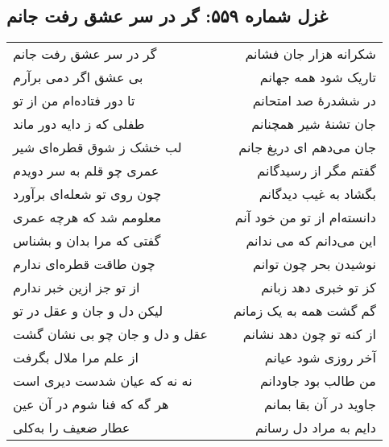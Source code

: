 \begin{center}
\section*{غزل شماره ۵۵۹: گر در سر عشق رفت جانم}
\label{sec:559}
\begin{longtable}{l p{0.5cm} r}
گر در سر عشق رفت جانم
&&
شکرانه هزار جان فشانم
\\
بی عشق اگر دمی برآرم
&&
تاریک شود همه جهانم
\\
تا دور فتاده‌ام من از تو
&&
در ششدرهٔ صد امتحانم
\\
طفلی که ز دایه دور ماند
&&
جان تشنهٔ شیر همچنانم
\\
لب خشک ز شوق قطره‌ای شیر
&&
جان می‌دهم ای دریغ جانم
\\
عمری چو قلم به سر دویدم
&&
گفتم مگر از رسیدگانم
\\
چون روی تو شعله‌ای برآورد
&&
بگشاد به غیب دیدگانم
\\
معلومم شد که هرچه عمری
&&
دانسته‌ام از تو من خود آنم
\\
گفتی که مرا بدان و بشناس
&&
این می‌دانم که می ندانم
\\
چون طاقت قطره‌ای ندارم
&&
نوشیدن بحر چون توانم
\\
از تو جز ازین خبر ندارم
&&
کز تو خبری دهد زبانم
\\
لیکن دل و جان و عقل در تو
&&
گم گشت همه به یک زمانم
\\
عقل و دل و جان چو بی نشان گشت
&&
از کنه تو چون دهد نشانم
\\
از علم مرا ملال بگرفت
&&
آخر روزی شود عیانم
\\
نه نه که عیان شدست دیری است
&&
من طالب بود جاودانم
\\
هر گه که فنا شوم در آن عین
&&
جاوید در آن بقا بمانم
\\
عطار ضعیف را به‌کلی
&&
دایم به مراد دل رسانم
\\
\end{longtable}
\end{center}
